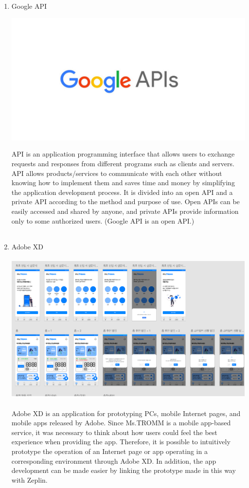 \documentclass[conference]{IEEEtran}
\begin{document}
\begin{enumerate}
    \item Google API \\ 
    \centerline{\includegraphics[scale=0.3]{assets/googleapi.jpg}}
    API is an application programming interface that allows users to exchange requests and responses from different programs such as clients and servers. API allows products/services to communicate with each other without knowing how to implement them and saves time and money by simplifying the application development process. It is divided into an open API and a private API according to the method and purpose of use. Open APIs can be easily accessed and shared by anyone, and private APIs provide information only to some authorized users. (Google API is an open API.) \\ \\ 
    
    \item Adobe XD \\ \\
    \includegraphics[scale=0.9]{assets/XD.png}
     \\ \\Adobe XD is an application for prototyping PCs, mobile Internet pages, and mobile apps released by Adobe. Since Ms.TROMM is a mobile app-based service, it was necessary to think about how users could feel the best experience when providing the app. Therefore, it is possible to intuitively prototype the operation of an Internet page or app operating in a corresponding environment through Adobe XD. In addition, the app development can be made easier by linking the prototype made in this way with Zeplin.\\ \\ \\ \\
    

\end{enumerate}
\end{document}

